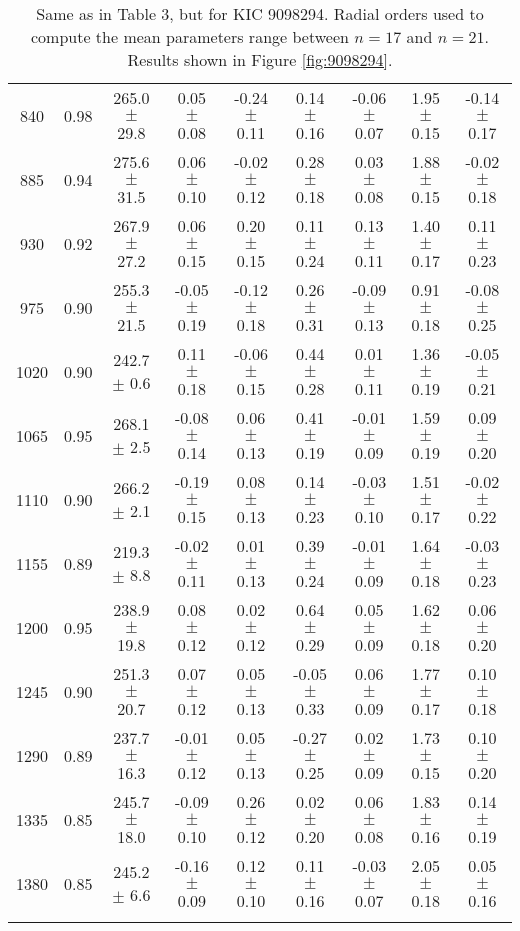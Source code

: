 \documentclass[twocolumn]{aastex61}%
\begin{document}
\begin{table}[ht]
\begin{tabular}{ccc|ccccc|c}
840 & 0.98 & 265.0 $\pm$ 29.8 & 0.05 $\pm$ 0.08 & -0.24 $\pm$ 0.11 & 0.14 $\pm$ 0.16 & -0.06 $\pm$ 0.07 & 1.95 $\pm$ 0.15 & -0.14 $\pm$ 0.17\\
885 & 0.94 & 275.6 $\pm$ 31.5 & 0.06 $\pm$ 0.10 & -0.02 $\pm$ 0.12 & 0.28 $\pm$ 0.18 & 0.03 $\pm$ 0.08 & 1.88 $\pm$ 0.15 & -0.02 $\pm$ 0.18\\
930 & 0.92 & 267.9 $\pm$ 27.2 & 0.06 $\pm$ 0.15 & 0.20 $\pm$ 0.15 & 0.11 $\pm$ 0.24 & 0.13 $\pm$ 0.11 & 1.40 $\pm$ 0.17 & 0.11 $\pm$ 0.23\\
975 & 0.90 & 255.3 $\pm$ 21.5 & -0.05 $\pm$ 0.19 & -0.12 $\pm$ 0.18 & 0.26 $\pm$ 0.31 & -0.09 $\pm$ 0.13 & 0.91 $\pm$ 0.18 & -0.08 $\pm$ 0.25\\
1020 & 0.90 & 242.7 $\pm$ 0.6 & 0.11 $\pm$ 0.18 & -0.06 $\pm$ 0.15 & 0.44 $\pm$ 0.28 & 0.01 $\pm$ 0.11 & 1.36 $\pm$ 0.19 & -0.05 $\pm$ 0.21\\
1065 & 0.95 & 268.1 $\pm$ 2.5 & -0.08 $\pm$ 0.14 & 0.06 $\pm$ 0.13 & 0.41 $\pm$ 0.19 & -0.01 $\pm$ 0.09 & 1.59 $\pm$ 0.19 & 0.09 $\pm$ 0.20\\
1110 & 0.90 & 266.2 $\pm$ 2.1 & -0.19 $\pm$ 0.15 & 0.08 $\pm$ 0.13 & 0.14 $\pm$ 0.23 & -0.03 $\pm$ 0.10 & 1.51 $\pm$ 0.17 & -0.02 $\pm$ 0.22\\
1155 & 0.89 & 219.3 $\pm$ 8.8 & -0.02 $\pm$ 0.11 & 0.01 $\pm$ 0.13 & 0.39 $\pm$ 0.24 & -0.01 $\pm$ 0.09 & 1.64 $\pm$ 0.18 & -0.03 $\pm$ 0.23\\
1200 & 0.95 & 238.9 $\pm$ 19.8 & 0.08 $\pm$ 0.12 & 0.02 $\pm$ 0.12 & 0.64 $\pm$ 0.29 & 0.05 $\pm$ 0.09 & 1.62 $\pm$ 0.18 & 0.06 $\pm$ 0.20\\
1245 & 0.90 & 251.3 $\pm$ 20.7 & 0.07 $\pm$ 0.12 & 0.05 $\pm$ 0.13 & -0.05 $\pm$ 0.33 & 0.06 $\pm$ 0.09 & 1.77 $\pm$ 0.17 & 0.10 $\pm$ 0.18\\
1290 & 0.89 & 237.7 $\pm$ 16.3 & -0.01 $\pm$ 0.12 & 0.05 $\pm$ 0.13 & -0.27 $\pm$ 0.25 & 0.02 $\pm$ 0.09 & 1.73 $\pm$ 0.15 & 0.10 $\pm$ 0.20\\
1335 & 0.85 & 245.7 $\pm$ 18.0 & -0.09 $\pm$ 0.10 & 0.26 $\pm$ 0.12 & 0.02 $\pm$ 0.20 & 0.06 $\pm$ 0.08 & 1.83 $\pm$ 0.16 & 0.14 $\pm$ 0.19\\
1380 & 0.85 & 245.2 $\pm$ 6.6 & -0.16 $\pm$ 0.09 & 0.12 $\pm$ 0.10 & 0.11 $\pm$ 0.16 & -0.03 $\pm$ 0.07 & 2.05 $\pm$ 0.18 & 0.05 $\pm$ 0.16\\\vspace{-0.35cm}
\end{tabular}
\parbox{2\hsize}{\caption{Same as in Table 3, but for KIC 9098294. Radial orders used to compute the mean parameters range between $n=17$ and $n=21$. Results shown in Figure \ref{fig:9098294}.}\label{tab:9098294}}\vspace{-0.2cm}
\end{table}
\end{document}
